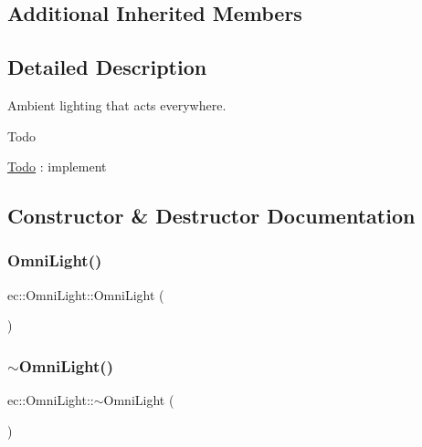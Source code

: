 \subsection*{Additional Inherited Members}


\subsection{Detailed Description}
Ambient lighting that acts everywhere. 

\begin{DoxyRefDesc}{Todo}
\item[\mbox{\hyperlink{todo__todo000003}{Todo}}]\+: implement \end{DoxyRefDesc}


\subsection{Constructor \& Destructor Documentation}
\mbox{\label{classec_1_1_omni_light_aa0240a42641c82a0363f569fdc312f23}} 
\subsubsection{\texorpdfstring{Omni\+Light()}{OmniLight()}}
{\footnotesize\ttfamily ec\+::\+Omni\+Light\+::\+Omni\+Light (\begin{DoxyParamCaption}{ }\end{DoxyParamCaption})\hspace{0.3cm}{\ttfamily [explicit]}}

\mbox{\label{classec_1_1_omni_light_a58c4d1aaf29e659c03ee1193cbca3eed}} 
\subsubsection{\texorpdfstring{$\sim$\+Omni\+Light()}{~OmniLight()}}
{\footnotesize\ttfamily ec\+::\+Omni\+Light\+::$\sim$\+Omni\+Light (\begin{DoxyParamCaption}{ }\end{DoxyParamCaption})\hspace{0.3cm}{\ttfamily [default]}}



